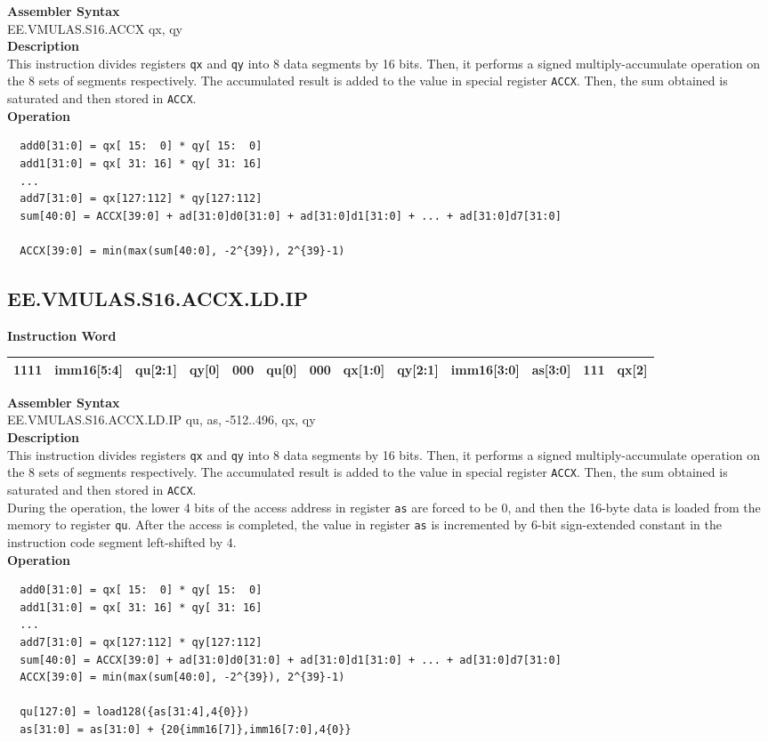 \textbf{Assembler Syntax} \\
EE.VMULAS.S16.ACCX qx, qy \\
\textbf{Description} \\
This instruction divides registers \lstinline{qx} and \lstinline{qy} into 8 data segments by 16 bits. Then, it performs a signed multiply-accumulate operation on the 8 sets of segments respectively. The accumulated result is added to the value in special register \lstinline{ACCX}. Then, the sum obtained is saturated and then stored in \lstinline{ACCX}.\\
\textbf{Operation}
\begin{lstlisting}
  add0[31:0] = qx[ 15:  0] * qy[ 15:  0]
  add1[31:0] = qx[ 31: 16] * qy[ 31: 16]
  ...
  add7[31:0] = qx[127:112] * qy[127:112]
  sum[40:0] = ACCX[39:0] + ad[31:0]d0[31:0] + ad[31:0]d1[31:0] + ... + ad[31:0]d7[31:0]

  ACCX[39:0] = min(max(sum[40:0], -2^{39}), 2^{39}-1)
\end{lstlisting}

\clearpage
\subsection{EE.VMULAS.S16.ACCX.LD.IP}\label{instruction:EEVMULASS16ACCXLDIP}
\setlength\tabcolsep{6pt}
\textbf{Instruction Word} \\
\begin{tabular}{|c|c|c|c|c|c|c|c|c|c|c|c|c|}
	\hline
	1111 & imm16[5:4] & qu[2:1] & qy[0] & 000 & qu[0] & 000 & qx[1:0] & qy[2:1] & imm16[3:0] & as[3:0] & 111 & qx[2] \\
	\hline
\end{tabular}

\textbf{Assembler Syntax} \\
EE.VMULAS.S16.ACCX.LD.IP qu, as, -512..496, qx, qy \\
\textbf{Description} \\
This instruction divides registers \lstinline{qx} and \lstinline{qy} into 8 data segments by 16 bits. Then, it performs a signed multiply-accumulate operation on the 8 sets of segments respectively. The accumulated result is added to the value in special register \lstinline{ACCX}. Then, the sum obtained is saturated and then stored in \lstinline{ACCX}. \\ During the operation, the lower 4 bits of the access address in register \lstinline{as} are forced to be 0, and then the 16-byte data is loaded from the memory to register \lstinline{qu}. After the access is completed, the value in register \lstinline{as} is incremented by 6-bit sign-extended constant in the instruction code segment left-shifted by 4.\\
\textbf{Operation}
\begin{lstlisting}
  add0[31:0] = qx[ 15:  0] * qy[ 15:  0]
  add1[31:0] = qx[ 31: 16] * qy[ 31: 16]
  ...
  add7[31:0] = qx[127:112] * qy[127:112]
  sum[40:0] = ACCX[39:0] + ad[31:0]d0[31:0] + ad[31:0]d1[31:0] + ... + ad[31:0]d7[31:0]
  ACCX[39:0] = min(max(sum[40:0], -2^{39}), 2^{39}-1)

  qu[127:0] = load128({as[31:4],4{0}})
  as[31:0] = as[31:0] + {20{imm16[7]},imm16[7:0],4{0}}
\end{lstlisting}

